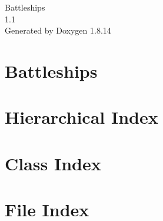 \documentclass[twoside]{book}
\newcommand{\+}{\discretionary{\mbox{\scriptsize$\hookleftarrow$}}{}{}}
\newcommand{\clearemptydoublepage}{%
  \newpage{\pagestyle{empty}\cleardoublepage}%
}
\begin{document}
\hypersetup{pageanchor=false,
             bookmarksnumbered=true,
             pdfencoding=unicode
            }
\begin{titlepage}
\vspace*{7cm}
\begin{center}%
{\Large Battleships \\[1ex]\large 1.\+1 }\\
\vspace*{1cm}
{\large Generated by Doxygen 1.8.14}\\
\end{center}
\end{titlepage}
\clearemptydoublepage
{}
\tableofcontents
\clearemptydoublepage
{}
\hypersetup{pageanchor=true}

\chapter{Battleships}
\label{md__d_1_kouluhommat__advanced__object-_oriented__programming_lopputy_xC3_xB6__battleship__battleship__r_e_a_d_m_e}

\chapter{Hierarchical Index}

\chapter{Class Index}

\chapter{File Index}

\end{document}
